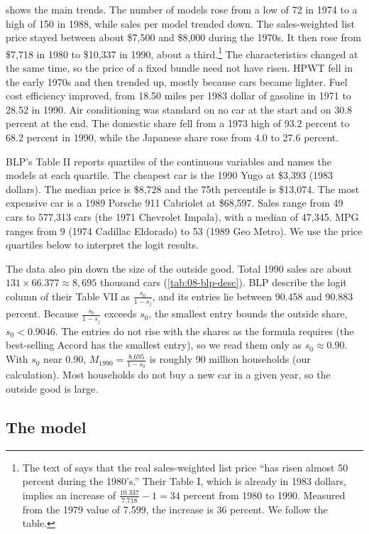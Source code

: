  shows the main trends. The number of models rose from a low of 72 in 1974 to a
high of 150 in 1988, while sales per model trended down. The sales-weighted list price stayed between
about \$7,500 and \$8,000 during the 1970s. It then rose from \$7,718 in 1980 to \$10,337 in 1990, about a
third.\footnote{The text of \citet[p.~870]{BerryLevinsohnPakes1995} says that the real sales-weighted list price
``has risen almost 50 percent during the 1980's.'' Their Table I, which is already in 1983 dollars, implies an
increase of $\frac{10.337}{7.718} - 1 = 34$ percent from 1980 to 1990. Measured from the 1979 value of 7.599, the
increase is 36 percent. We follow the table.} The characteristics changed at the same time, so the price of a fixed bundle need not have
risen. HPWT fell in the early 1970s and then trended up, mostly because cars became lighter. Fuel cost
efficiency improved, from 18.50 miles per 1983 dollar of gasoline in 1971 to 28.52 in 1990. Air
conditioning was standard on no car at the start and on 30.8 percent at the end. The domestic share
fell from a 1973 high of 93.2 percent to 68.2 percent in 1990, while the Japanese share rose from 4.0 to
27.6 percent.

BLP's Table II reports quartiles of the continuous variables and names the models at each quartile.
The cheapest car is the 1990 Yugo at \$3,393 (1983 dollars). The median price is \$8,728 and the 75th
percentile is \$13,074. The most expensive car is a 1989 Porsche 911 Cabriolet at \$68,597. Sales range
from 49 cars to 577,313 cars (the 1971 Chevrolet Impala), with a median of 47,345. MPG ranges from 9
(1974 Cadillac Eldorado) to 53 (1989 Geo Metro). We use the price quartiles below to interpret the
logit results.

The data also pin down the size of the outside good. Total 1990 sales are about
$131\times 66.377\approx 8{,}695$ thousand cars (\cref{tab:08-blp-desc}). BLP describe the logit column
of their Table VII as $\frac{s_0}{1-s_j}$, and its entries lie between 90.458 and 90.883 percent.
Because $\frac{s_0}{1-s_j}$ exceeds $s_0$, the smallest entry bounds the outside share, $s_0 < 0.9046$.
The entries do not rise with the shares as the formula requires (the best-selling Accord has the
smallest entry), so we read them only as $s_0 \approx 0.90$. With $s_0$ near 0.90,
$M_{1990}=\frac{8.695}{1-s_0}$ is roughly 90 million households (our calculation). Most households do not buy a new car in a given year, so the outside good is large.

\subsection{The model}\label{sec:08-blp95-model}


